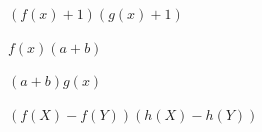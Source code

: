 \documentclass{article}
\begin{document}
$(f(x)+1)(g(x)+1)$

$f(x)(a+b)$

$(a+b)g(x)$

$(f(X)-f(Y))(h(X)-h(Y))$
\end{document}
